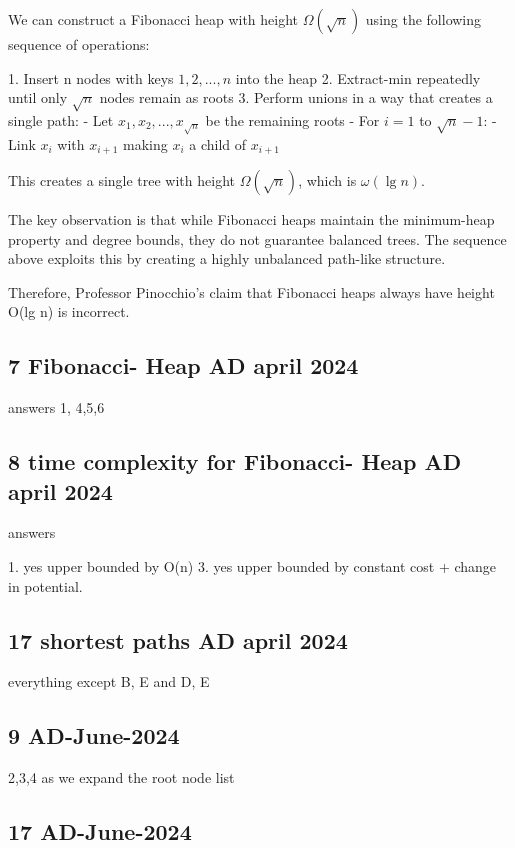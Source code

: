 \documentclass{article}
\theoremstyle{definition}
\begin{document}
We can construct a Fibonacci heap with height $\Omega(\sqrt{n})$ using the following sequence of operations:

1. Insert n nodes with keys $1, 2, ..., n$ into the heap
2. Extract-min repeatedly until only $\sqrt{n}$ nodes remain as roots
3. Perform unions in a way that creates a single path:
   - Let $x_1, x_2, ..., x_{\sqrt{n}}$ be the remaining roots
   - For $i = 1$ to $\sqrt{n}-1$:
     - Link $x_i$ with $x_{i+1}$ making $x_i$ a child of $x_{i+1}$

This creates a single tree with height $\Omega(\sqrt{n})$, which is $\omega(\lg n)$.

The key observation is that while Fibonacci heaps maintain the minimum-heap property and degree bounds, they do not guarantee balanced trees. The sequence above exploits this by creating a highly unbalanced path-like structure.

Therefore, Professor Pinocchio's claim that Fibonacci heaps always have height O(lg n) is incorrect.




\subsection{7 Fibonacci- Heap AD april 2024}

answers 
1, 4,5,6

\subsection{8 time complexity for Fibonacci- Heap AD april 2024}

answers

1. yes upper bounded by O(n)
3. yes upper bounded by constant cost + change in potential.

\subsection{17 shortest paths AD april 2024}

everything except {B, E} and {D, E}


\subsection{9 AD-June-2024}

2,3,4 as we expand the root node list


\subsection{17 AD-June-2024}






\end{document}
